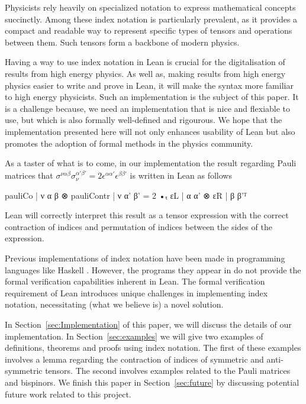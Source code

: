 \documentclass[a4paper, 11pt]{article}
\begin{document}
Physicists rely heavily on specialized notation to express mathematical concepts succinctly. 
Among these index notation is particularly prevalent,
 as it provides a compact and readable way to represent specific types of tensors and operations
 between them. Such tensors form a backbone of modern physics. 

Having a way to use index notation in Lean is crucial for the digitalisation of 
results from high energy physics. 
As well as, making results from high energy physics easier to write and prove in Lean, 
it will make the syntax more familiar to high energy physicists. 
Such an implementation is the subject of this paper. 
It is a challenge because, we need an implementation that is nice and flexiable to use, 
but which is also formally well-defined and rigourous. 
We hope that the implementation presented here will
not only enhances usability of Lean but also promotes the adoption of formal methods in the 
physics community.

As a taster of what is to come, in our implementation the result regarding Pauli matrices 
that $\sigma^{\nu \alpha \dot \beta}\sigma_\nu^{ \alpha' \dot \beta'} = 2 \epsilon^{\alpha \alpha'}\epsilon^{\beta \beta'}$ 
is written in Lean as follows
\begin{code}
{pauliCo | ν α β ⊗ pauliContr | ν α' β' = 2 •ₜ εL | α α' ⊗ εR | β β'}ᵀ
\end{code}
Lean will correctly interpret this result as a tensor expression with the correct contraction of indices 
and permutation of indices between the sides of the expression.

Previous implementations of index notation have been made in programming languages like Haskell 
\cite{haskellPaper}. However, the programs they appear in do not
 provide the formal verification capabilities inherent in Lean. 
 The formal verification requirement of Lean introduces unique challenges in implementing index 
 notation, necessitating (what we believe is) a novel solution.

In Section~\ref{sec:Implementation} of this paper, we will discuss the details of our implementation. 
In Section~\ref{sec:examples} we will give two examples of definitions, theorems and proofs using index notation.
The first of these examples involves a lemma regarding the contraction of indices of symmetric and anti-symmetric tensors. 
The second involves examples related to the Pauli matrices and bispinors. 
We finish this paper in Section~\ref{sec:future} by discussing potential future work related to this project.
\end{document}
